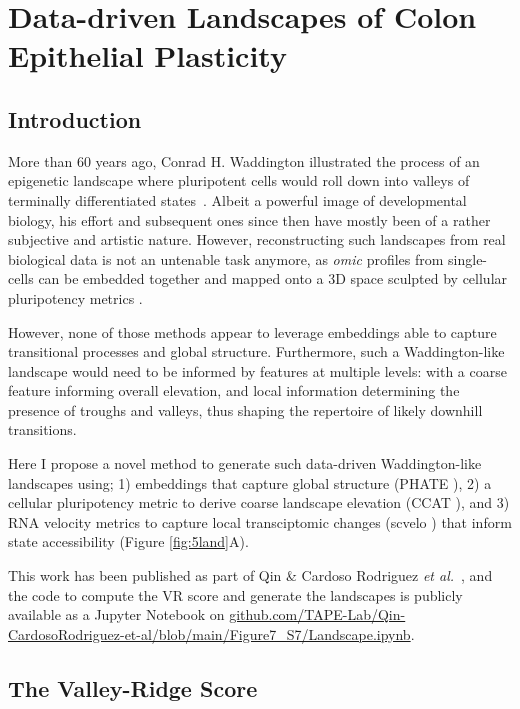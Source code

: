 \chapter{Data-driven Landscapes of Colon Epithelial Plasticity}
\label{05vr}

\newpage
\section{Introduction}

More than 60 years ago, Conrad H. Waddington illustrated the process of an epigenetic landscape where pluripotent cells would roll down into valleys of terminally differentiated states~\cite{ch_waddington_waddington_1957}. Albeit a powerful image of developmental biology, his effort and subsequent ones since then have mostly been of a rather subjective and artistic nature. However, reconstructing such landscapes from real biological data is not an untenable task anymore, as \emph{omic} profiles from single-cells can be embedded together and mapped onto a 3D space sculpted by cellular pluripotency metrics \cite{chen_single-cell_2019}.

However, none of those methods appear to leverage embeddings able to capture transitional processes and global structure. Furthermore, such a Waddington-like landscape would need to be informed by features at multiple levels: with a coarse feature informing overall elevation, and local information determining the presence of troughs and valleys, thus shaping the repertoire of likely downhill transitions.

Here I propose a novel method to generate such data-driven Waddington-like landscapes using; 1) embeddings that capture global structure (PHATE \cite{moon_visualizing_2019}), 2) a cellular pluripotency metric to derive coarse landscape elevation (CCAT \cite{teschendorff_single-cell_2017}), and 3) RNA velocity metrics to capture local transciptomic changes (scvelo \cite{bergen_generalizing_2020}) that inform state accessibility (Figure \ref{fig:5land}A).

This work has been published as part of Qin \& Cardoso Rodriguez \emph{et al.}~\cite{cardoso_rodriguez_single-cell_2023}, and the code to compute the VR score and generate the landscapes is publicly available as a Jupyter Notebook on \url{github.com/TAPE-Lab/Qin-CardosoRodriguez-et-al/blob/main/Figure7_S7/Landscape.ipynb}. 

\section{The Valley-Ridge Score}


